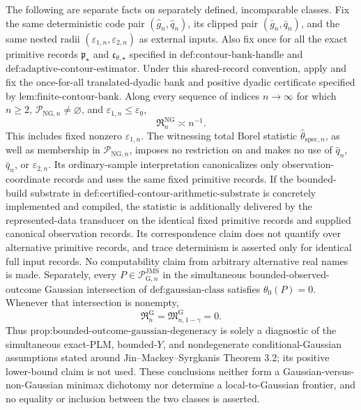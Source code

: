 The following are separate facts on separately defined, incomparable classes. Fix the same deterministic code pair \((\widehat g_n,\widehat q_n)\), its clipped pair \((\bar g_n,\bar q_n)\), and the same nested radii \((\varepsilon_{1,n},\varepsilon_{2,n})\) as external inputs. Also fix once for all the exact primitive records \(\mathfrak p_{\star}\) and \(\mathfrak c_{\theta,\star}\) specified in \(\text{def:contour-bank-handle}\) and \(\text{def:adaptive-contour-estimator}\). Under this shared-record convention, apply and fix the once-for-all translated-dyadic bank and positive dyadic certificate specified by \(\text{lem:finite-contour-bank}\). Along every sequence of indices \(n\to\infty\) for which \(n\ge2\), \(\mathcal P_{\mathrm{NG},n}\neq\varnothing\), and \(\varepsilon_{1,n}\le\varepsilon_0\),
\[
 \mathfrak R_n^{\mathrm{NG}}\asymp n^{-1}.
\]
This includes fixed nonzero \(\varepsilon_{1,n}\). The witnessing total Borel statistic \(\widehat\theta_{\mathrm{spec},n}\), as well as membership in \(\mathcal P_{\mathrm{NG},n}\), imposes no restriction on and makes no use of \(\widehat q_n\), \(\bar q_n\), or \(\varepsilon_{2,n}\). Its ordinary-sample interpretation canonicalizes only observation-coordinate records and uses the same fixed primitive records. If the bounded-build substrate in \(\text{def:certified-contour-arithmetic-substrate}\) is concretely implemented and compiled, the statistic is additionally delivered by the represented-data transducer on the identical fixed primitive records and supplied canonical observation records. Its correspondence claim does not quantify over alternative primitive records, and trace determinism is asserted only for identical full input records. No computability claim from arbitrary alternative real names is made. Separately, every \(P\in\mathcal P_{\mathrm G,n}^{\mathrm{JMS}}\) in the simultaneous bounded-observed-outcome Gaussian intersection of \(\text{def:gaussian-class}\) satisfies \(\theta_0(P)=0\). Whenever that intersection is nonempty,
\[
 \mathfrak R_n^{\mathrm G}
 =\mathfrak M_{n,1-\gamma}^{\mathrm G}
 =0.
\]
Thus \(\text{prop:bounded-outcome-gaussian-degeneracy}\) is solely a diagnostic of the simultaneous exact-PLM, bounded-\(Y\), and nondegenerate conditional-Gaussian assumptions stated around Jin--Mackey--Syrgkanis Theorem 3.2; its positive lower-bound claim is not used. These conclusions neither form a Gaussian-versus-non-Gaussian minimax dichotomy nor determine a local-to-Gaussian frontier, and no equality or inclusion between the two classes is asserted.